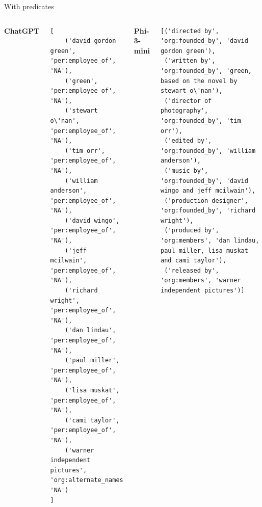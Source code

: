 \documentclass[aspectratio=169,xcolor=dvipsnames]{beamer}
\begin{document}
\begin{frame}[fragile]{With predicates}
\begin{columns}[c]
\textbf{ChatGPT}
\begin{verbatim}
[
    ('david gordon green', 'per:employee_of', 'NA'),
    ('green', 'per:employee_of', 'NA'),
    ('stewart o\'nan', 'per:employee_of', 'NA'),
    ('tim orr', 'per:employee_of', 'NA'),
    ('william anderson', 'per:employee_of', 'NA'),
    ('david wingo', 'per:employee_of', 'NA'),
    ('jeff mcilwain', 'per:employee_of', 'NA'),
    ('richard wright', 'per:employee_of', 'NA'),
    ('dan lindau', 'per:employee_of', 'NA'),
    ('paul miller', 'per:employee_of', 'NA'),
    ('lisa muskat', 'per:employee_of', 'NA'),
    ('cami taylor', 'per:employee_of', 'NA'),
    ('warner independent pictures', 'org:alternate_names', 'NA')
]
\end{verbatim}
\textbf{Phi-3-mini}
\begin{verbatim}
[('directed by', 'org:founded_by', 'david gordon green'),
 ('written by', 'org:founded_by', 'green, based on the novel by stewart o\'nan'),
 ('director of photography', 'org:founded_by', 'tim orr'),
 ('edited by', 'org:founded_by', 'william anderson'),
 ('music by', 'org:founded_by', 'david wingo and jeff mcilwain'),
 ('production designer', 'org:founded_by', 'richard wright'),
 ('produced by', 'org:members', 'dan lindau, paul miller, lisa muskat and cami taylor'),
 ('released by', 'org:members', 'warner independent pictures')]
\end{verbatim}
\end{columns}
\end{frame}
\end{document}
